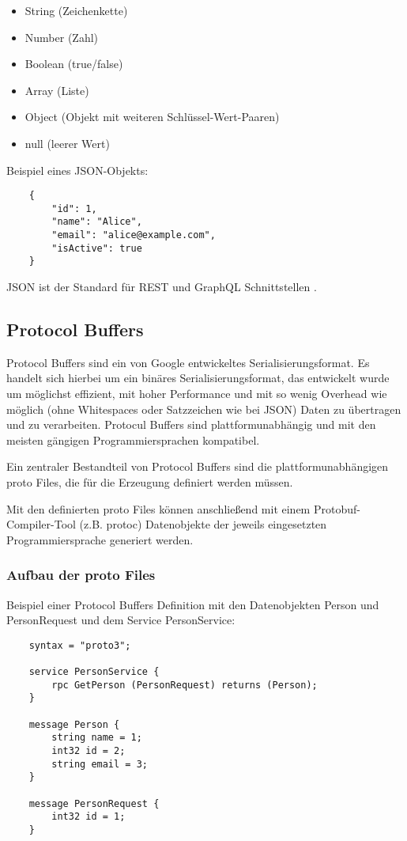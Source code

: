 \begin{itemize}
	\item String (Zeichenkette)
	\item Number (Zahl)
	\item Boolean (true/false)
	\item Array (Liste)
	\item Object (Objekt mit weiteren Schl\"ussel-Wert-Paaren)
	\item null (leerer Wert)
\end{itemize}
\parencite{ecma404-2017}

Beispiel eines JSON-Objekts:
\begin{verbatim}
	{
		"id": 1,
		"name": "Alice",
		"email": "alice@example.com",
		"isActive": true
	}
\end{verbatim}

JSON ist der Standard für REST und GraphQL Schnittstellen \parencite{Microsoft2025,graphql-org}. 




\subsection{Protocol Buffers}
Protocol Buffers sind ein von Google entwickeltes Serialisierungsformat. Es handelt sich hierbei um ein binäres Serialisierungsformat, das entwickelt wurde um möglichst effizient, mit hoher Performance und mit so wenig Overhead wie möglich (ohne Whitespaces oder Satzzeichen wie bei JSON) Daten zu übertragen und zu verarbeiten. Protocul Buffers sind plattformunabhängig und mit den meisten gängigen Programmiersprachen kompatibel.

Ein zentraler Bestandteil von Protocol Buffers sind die plattformunabhängigen proto Files, die für die Erzeugung definiert werden müssen.

Mit den definierten proto Files können anschließend mit einem Protobuf-Compiler-Tool (z.B. protoc) Datenobjekte der jeweils eingesetzten Programmiersprache generiert werden.

\subsubsection*{Aufbau der proto Files}

Beispiel einer Protocol Buffers Definition mit den Datenobjekten Person und PersonRequest und dem Service PersonService:
\begin{verbatim}
	syntax = "proto3";
	
	service PersonService {
		rpc GetPerson (PersonRequest) returns (Person);
	}
	
	message Person {
		string name = 1;
		int32 id = 2;
		string email = 3;
	}
	
	message PersonRequest {
		int32 id = 1;
	}
\end{verbatim}

